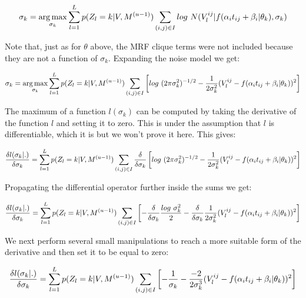 \begin{equation}
 \sigma_k = \argmax_{\sigma_k} \sum_{l=1}^L p(Z_l = k | V, \Mu^{(u-1)}) \sum_{(i,j) \in I} log\ N(V_l^{ij} | f(\alpha_i t_{ij} + \beta_i | \theta_k), \sigma_k)
\end{equation}

Note that, just as for $\theta$ above, the MRF clique terms were not included because they are not a function of $\sigma_k$. Expanding the noise model we get:

\begin{equation}
 \sigma_k = \argmax_{\sigma_k} \sum_{l=1}^L p(Z_l = k | V, \Mu^{(u-1)}) \sum_{(i,j) \in I} \left[ log\ (2 \pi \sigma_k^2)^{-1/2} - \frac{1}{2\sigma_k^2}(V_l^{ij} - f(\alpha_i t_{ij} + \beta_i | \theta_k))^2 \right]
\end{equation}

The maximum of a function $l(\sigma_k)$ can be computed by taking the derivative of the function $l$ and setting it to zero. This is under the assumption that $l$ is differentiable, which it is but we won't prove it here. This gives:

\begin{equation}
 \frac{\delta l(\sigma_k|.)}{\delta \sigma_k} =  \sum_{l=1}^L p(Z_l = k | V, M^{(u-1)}) \sum_{(i,j) \in I} \frac{\delta}{\delta \sigma_k} \left[ log\ (2 \pi \sigma_k^2)^{-1/2} - \frac{1}{2\sigma_k^2}(V_l^{ij} - f(\alpha_i t_{ij} + \beta_i | \theta_k))^2 \right]
\end{equation}

Propagating the differential operator further inside the sums we get:

\begin{equation}
 \frac{\delta l(\sigma_k|.)}{\delta \sigma_k} =  \sum_{l=1}^L p(Z_l = k | V, M^{(u-1)}) \sum_{(i,j) \in I} \left[ -\frac{\delta}{\delta \sigma_k} \frac{log\ \sigma_k^2}{2} - \frac{\delta}{\delta \sigma_k} \frac{1}{2\sigma_k^2}(V_l^{ij} - f(\alpha_i t_{ij} + \beta_i | \theta_k))^2 \right]
\end{equation}

We next perform several small manipulations to reach a more suitable form of the derivative and then set it to be equal to zero:

\begin{equation}
 \frac{\delta l(\sigma_k|.)}{\delta \sigma_k} =  \sum_{l=1}^L p(Z_l = k | V, M^{(u-1)}) \sum_{(i,j) \in I} \left[ - \frac{1}{\sigma_k} - \frac{-2}{2\sigma_k^3}(V_l^{ij} - f(\alpha_i t_{ij} + \beta_i | \theta_k))^2 \right]
\end{equation}


